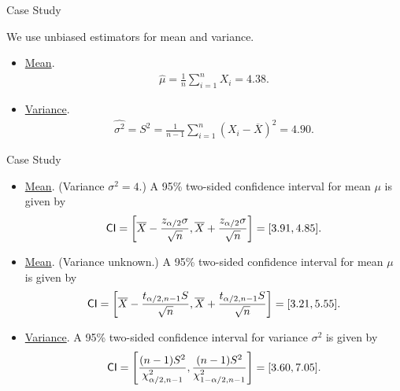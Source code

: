 \begin{frame}{Case Study}

\justifying
{} We use unbiased estimators for mean and variance.
\begin{itemize}
	\item \underline{Mean}.
	\begin{align*}
	\widehat{\mu} = \frac{1}{n}\sum_{i=1}^n X_i = 4.38.
	\end{align*}
	\item \underline{Variance}.
	\begin{align*}
	\widehat{\sigma^2} = S^2 = \frac{1}{n-1} \sum_{i=1}^n (X_i - \overline{X})^2 = 4.90.
	\end{align*}
\end{itemize}

\end{frame}


\begin{frame}{Case Study}

\justifying
{}
\begin{itemize}
	\justifying
	\item \underline{Mean}. (Variance $\sigma^2 = 4$.) A 95\% two-sided confidence interval for mean $\mu$ is given by
	\begin{align*}
	\mathsf{CI} = \left[\overline{X} - \frac{z_{\alpha/2}\sigma}{\sqrt{n}}, \overline{X} + \frac{z_{\alpha/2}\sigma}{\sqrt{n}} \right] = [3.91, 4.85].
	\end{align*}
	\item \underline{Mean}. (Variance unknown.) A 95\% two-sided confidence interval for mean $\mu$ is given by
	\begin{align*}
	\mathsf{CI} = \left[\overline{X} - \frac{t_{\alpha/2, n-1} S}{\sqrt{n}}, \overline{X} + \frac{t_{\alpha/2, n-1} S}{\sqrt{n}} \right] = [3.21, 5.55].
	\end{align*}
	\item \underline{Variance}. A 95\% two-sided confidence interval for variance $\sigma^2$ is given by
	\begin{align*}
	\mathsf{CI} = \left[\frac{(n-1)S^2}{\chi_{\alpha/2, n-1}^2}, \frac{(n-1)S^2}{\chi_{1-\alpha/2, n-1}^2} \right] = [3.60, 7.05].
	\end{align*}
\end{itemize}

\end{frame}


